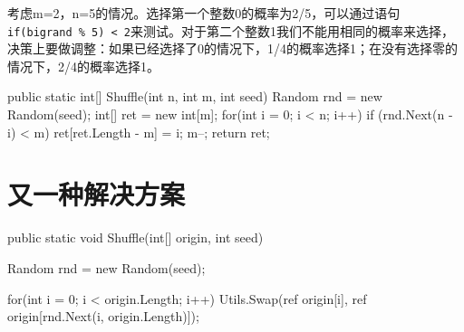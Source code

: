 考虑m=2，n=5的情况。选择第一个整数0的概率为2/5，可以通过语句\lstinline!if(bigrand % 5) < 2!来测试。对于第二个整数1我们不能用相同的概率来选择，决策上要做调整：如果已经选择了0的情况下，1/4的概率选择1；在没有选择零的情况下，2/4的概率选择1。

\begin{CSharp}
        public static int[] Shuffle(int n, int m, int seed)
        {
            Random rnd = new Random(seed);
            int[] ret = new int[m];
            for(int i = 0; i < n; i++)
            {
                if (rnd.Next(n - i) < m)
                {
                    ret[ret.Length - m] = i;
                    m--;
                }
            }
            return ret;
        }
\end{CSharp}        


\section{又一种解决方案}

\begin{CSharp}
        public static void Shuffle(int[] origin, int seed)
        {
            Random rnd = new Random(seed);

            for(int i = 0; i < origin.Length; i++)
            {
                Utils.Swap(ref origin[i], ref origin[rnd.Next(i, origin.Length)]);
            }
        }
\end{CSharp}
